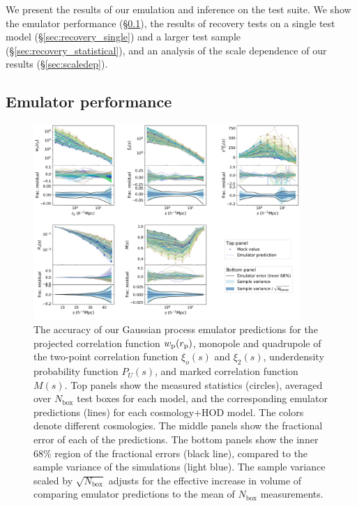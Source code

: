 We present the results of our emulation and inference on the \aemulus test suite.
We show the emulator performance (\S\ref{sec:emuperf}), the results of recovery tests on a single test model (\S\ref{sec:recovery_single}) and a larger test sample (\S\ref{sec:recovery_statistical}), and an analysis of the scale dependence of our results (\S\ref{sec:scaledep}).

\subsection{Emulator performance}
\label{sec:emuperf}

\begin{figure}[htp!]
\centering
\includegraphics[width=0.9\textwidth]{emu_accuracy}
\caption{The accuracy of our Gaussian process emulator predictions for the projected correlation function $w_{\rm p}(r_{\rm p})$, monopole and quadrupole of the two-point correlation function $\xi_o(s)$ and $\xi_2(s)$, underdensity probability function $P_U(s)$, and marked correlation function $M(s)$. Top panels show the  measured statistics (circles), averaged over $N_\mathrm{box}$ test boxes for each model, and the corresponding emulator predictions (lines) for each cosmology+HOD model. The colors denote different cosmologies. The middle panels show the fractional error of each of the predictions. The bottom panels show the inner 68\% region of the fractional errors (black line), compared to the sample variance of the simulations (light blue). The sample variance scaled by $\sqrt{N_\mathrm{box}}$ adjusts for the effective increase in volume of comparing emulator predictions to the mean of $N_\mathrm{box}$ measurements.}
\label{fig:emu_accuracy}
\end{figure}

